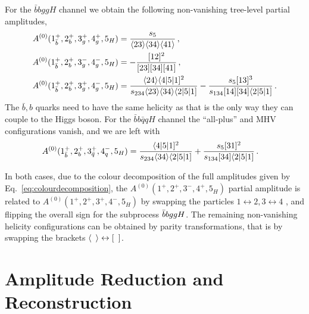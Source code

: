 \documentclass[main.tex]{subfiles}
\begin{document}
For the $\bar{b} b g g H$ channel we obtain the following non-vanishing tree-level partial amplitudes,
\begin{align} \label{eq:A0bbggh}
	A^{(0)}(1^+_{\bar{b}},2^+_{b},3^+_g,4^+_g,5_{H}) &=  \frac{s_5}{\langle23\rangle \langle34\rangle \langle41\rangle} \,, \\
	A^{(0)}(1^+_{\bar{b}},2^+_{b},3^-_g,4^-_g,5_{H}) &= -\frac{[12]^2}{[23][34][41]} \,, \\
	A^{(0)}(1^+_{\bar{b}},2^+_{b},3^+_g,4^-_g,5_{H}) &= \frac{\langle24\rangle \langle4|5|1]^2}{s_{234} \langle23\rangle \langle34\rangle \langle2|5|1]}-\frac{s_5 [13]^3}{s_{134} [14] [34] \langle2|5|1]} \,.
\end{align}
The $\bar{b},b$ quarks need to have the same helicity as that is the only way they can couple to the Higgs boson. 
For the $\bar{b} b \bar{q} q H$ channel the ``all-plus'' and MHV configurations vanish, and we are left with
\begin{align} \label{eq:A0bbqqh}
	A^{(0)}(1^+_{\bar b},2^+_{b},3^+_{\bar q},4^-_{q},5_{H}) &=  \frac{\langle4|5|1]^2}{s_{234} \langle34\rangle \langle2|5|1]}+\frac{s_5 [31]^2}{s_{134} [34] \langle2|5|1]} \,. 
\end{align}

In both cases, due to the colour decomposition of the full amplitudes given by Eq.~\eqref{eq:colourdecomposition}, the $A^{(0)}(1^+,2^+,3^-,4^+,5_{H})$ partial amplitude is related to $A^{(0)}(1^+,2^+,3^+,4^-,5_{H})$ by swapping the particles $1\leftrightarrow 2,3\leftrightarrow 4$ , and flipping the overall sign for the subprocess $\bar{b}bggH$. The remaining non-vanishing helicity configurations can be obtained by parity transformations, that is by swapping the brackets $\langle \phantom{1} \rangle \leftrightarrow [\phantom{1}]$.

\section{Amplitude Reduction and Reconstruction}
\label{Hbbsec:reduction}
\end{document}
